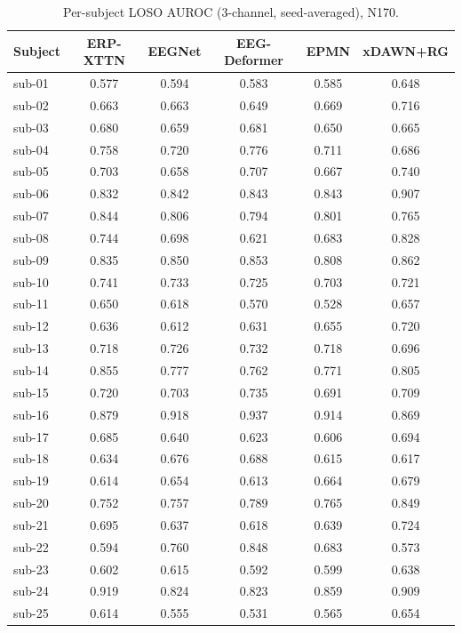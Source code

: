 \begin{table}[t]
\centering
\scriptsize
\caption{Per-subject LOSO AUROC (3-channel, seed-averaged), N170.}
\label{tab:persubj-n170}
\begin{tabular}{lccccc}
\toprule
Subject & ERP-XTTN & EEGNet & EEG-Deformer & EPMN & xDAWN+RG \\
\midrule
sub-01 & 0.577 & 0.594 & 0.583 & 0.585 & 0.648 \\
sub-02 & 0.663 & 0.663 & 0.649 & 0.669 & 0.716 \\
sub-03 & 0.680 & 0.659 & 0.681 & 0.650 & 0.665 \\
sub-04 & 0.758 & 0.720 & 0.776 & 0.711 & 0.686 \\
sub-05 & 0.703 & 0.658 & 0.707 & 0.667 & 0.740 \\
sub-06 & 0.832 & 0.842 & 0.843 & 0.843 & 0.907 \\
sub-07 & 0.844 & 0.806 & 0.794 & 0.801 & 0.765 \\
sub-08 & 0.744 & 0.698 & 0.621 & 0.683 & 0.828 \\
sub-09 & 0.835 & 0.850 & 0.853 & 0.808 & 0.862 \\
sub-10 & 0.741 & 0.733 & 0.725 & 0.703 & 0.721 \\
sub-11 & 0.650 & 0.618 & 0.570 & 0.528 & 0.657 \\
sub-12 & 0.636 & 0.612 & 0.631 & 0.655 & 0.720 \\
sub-13 & 0.718 & 0.726 & 0.732 & 0.718 & 0.696 \\
sub-14 & 0.855 & 0.777 & 0.762 & 0.771 & 0.805 \\
sub-15 & 0.720 & 0.703 & 0.735 & 0.691 & 0.709 \\
sub-16 & 0.879 & 0.918 & 0.937 & 0.914 & 0.869 \\
sub-17 & 0.685 & 0.640 & 0.623 & 0.606 & 0.694 \\
sub-18 & 0.634 & 0.676 & 0.688 & 0.615 & 0.617 \\
sub-19 & 0.614 & 0.654 & 0.613 & 0.664 & 0.679 \\
sub-20 & 0.752 & 0.757 & 0.789 & 0.765 & 0.849 \\
sub-21 & 0.695 & 0.637 & 0.618 & 0.639 & 0.724 \\
sub-22 & 0.594 & 0.760 & 0.848 & 0.683 & 0.573 \\
sub-23 & 0.602 & 0.615 & 0.592 & 0.599 & 0.638 \\
sub-24 & 0.919 & 0.824 & 0.823 & 0.859 & 0.909 \\
sub-25 & 0.614 & 0.555 & 0.531 & 0.565 & 0.654 \\

\end{tabular}
\end{table}
